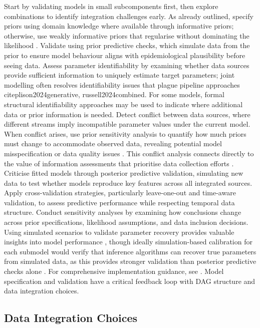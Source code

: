 \documentclass{article}
\begin{document}
Start by validating models in small subcomponents first, then explore combinations to identify integration challenges early.
As already outlined, specify priors using domain knowledge where available through informative priors; otherwise, use weakly informative priors that regularise without dominating the likelihood \citep{gelman2020bayesian}.
Validate using prior predictive checks, which simulate data from the prior to ensure model behaviour aligns with epidemiological plausibility before seeing data.
Assess parameter identifiability by examining whether data sources provide sufficient information to uniquely estimate target parameters; joint modelling often resolves identifiability issues that plague pipeline approaches \\citep{lison2024generative, russell2024combined}.
For some models, formal structural identifiability approaches may be used to indicate where additional data or prior information is needed.
Detect conflict between data sources, where different streams imply incompatible parameter values under the current model.
When conflict arises, use prior sensitivity analysis to quantify how much priors must change to accommodate observed data, revealing potential model misspecification or data quality issues \citep{roos2015sensitivity,nott2021approximation,kallioinen2021detecting}.
This conflict analysis connects directly to the value of information assessments that prioritise data collection efforts \citep{jackson2019value}.
Criticise fitted models through posterior predictive validation, simulating new data to test whether models reproduce key features across all integrated sources.
Apply cross-validation strategies, particularly leave-one-out and time-aware validation, to assess predictive performance while respecting temporal data structure.
Conduct sensitivity analyses by examining how conclusions change across prior specifications, likelihood assumptions, and data inclusion decisions.
Using simulated scenarios to validate parameter recovery provides valuable insights into model performance \citep{bouman2024bayesian}, though ideally simulation-based calibration for each submodel would verify that inference algorithms can recover true parameters from simulated data, as this provides stronger validation than posterior predictive checks alone \citep{talts2018validating}.
For comprehensive implementation guidance, see \citet{gelman2020bayesian}.
Model specification and validation have a critical feedback loop with DAG structure and data integration choices.

\subsection{Data Integration Choices}
\end{document}
